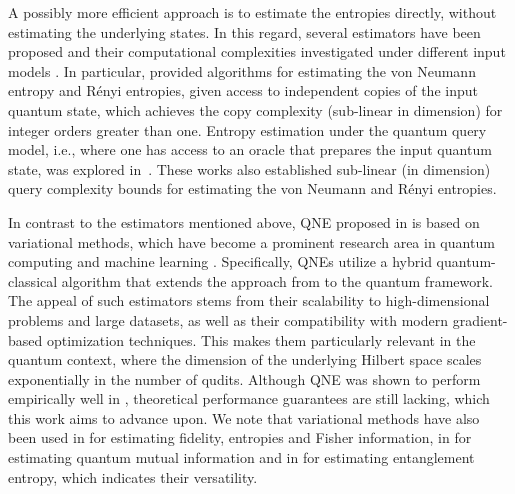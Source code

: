 \documentclass[a4paper,onecolumn,11pt,accepted=2026-05-12]{quantumarticle}
\begin{document}
A possibly more efficient approach is to estimate the entropies directly, without estimating the underlying states.  In this regard, several estimators have been proposed and their computational complexities  investigated under different input models \cite{Li2017QuantumEstimation,Subasi2019EntanglementCircuit,AISW-2020, Subramanian2019QuantumStates,Gilyen2019DistributionalWorld,Gur2021SublinearEntropy, Wang2022QuantumEntropies,Wang2022NewDistances,Gilyen2022ImprovedEstimation,Wang2022QuantumSystems,
Wang2023QuantumEstimation,Wang-Zhang-Li-2024,Wang-Zhang-2025}. In particular, \cite{AISW-2020} provided  algorithms for estimating the von Neumann entropy and R\'enyi entropies, given access to independent copies of the input quantum state,  which achieves the copy complexity (sub-linear in dimension) for integer orders greater than one.   Entropy estimation under the quantum query model, i.e., where one has access to an oracle that prepares the input quantum state, was explored in~\cite{Subramanian2019QuantumStates,Gur2021SublinearEntropy}. These works also established  sub-linear (in dimension) query complexity bounds for estimating the von Neumann  and R\'{e}nyi entropies.


In contrast to the  estimators mentioned above, QNE proposed in \cite{QNE-24} is based on  variational methods, which have become  a prominent research area in quantum computing and machine learning \cite{Biamonte2017QuantumLearning,Cerezo2020variationalquantum,Cerezo2021VariationalAlgorithms,Jaeger2023}. Specifically, QNEs utilize a hybrid quantum-classical algorithm that extends the approach from \cite{NWJ10,pmlr-v70-arora17a,Zhang-2018,belghazi-2018,SS-2021-aistats,SG-2021-neural,Birell-2021} to the quantum framework. The appeal of such estimators stems from their scalability to high-dimensional problems and large datasets, as well as their compatibility with modern gradient-based optimization techniques.  This makes them particularly relevant in the quantum context, where the dimension of the underlying Hilbert space scales exponentially in the number of qudits. Although QNE was shown to perform empirically well in \cite{QNE-24}, theoretical performance guarantees are still lacking,  which this work aims to advance upon. We note that variational methods have also been used in \cite{VQA-entropies-fidelity-2021} for estimating fidelity, entropies and Fisher information, in \cite{Shin2024} for estimating quantum mutual information and in \cite{lee2023estimating} for estimating entanglement entropy, which indicates their versatility. 
\end{document}
